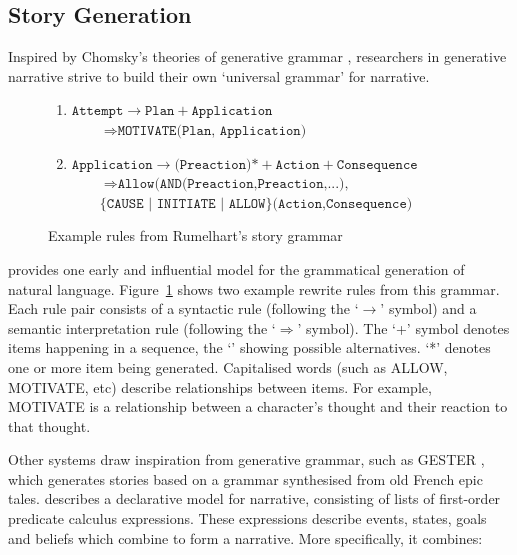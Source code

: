 \documentclass[11pt]{report}
\begin{document}
\subsection{Story Generation}
Inspired by Chomsky's theories of generative grammar \citep{chomsky1968sound}, researchers in generative narrative strive to build their own `universal grammar' for narrative.

\begin{figure}[!t]
  \begin{center}
  \begin{enumerate}
    \item $\texttt{Attempt}\rightarrow \texttt{Plan} + \texttt{Application}$\\
           $\qquad\Rightarrow\texttt{MOTIVATE(Plan, Application)}$
    \item $\texttt{Application}\rightarrow\texttt{(Preaction)*} + \texttt{Action} + \texttt{Consequence}$\\
           $\qquad\Rightarrow\texttt{Allow(AND(Preaction,Preaction,...),}$\\
           $\qquad\{\texttt{CAUSE | INITIATE | ALLOW}\}\texttt{(Action,Consequence)}$
  \end{enumerate}
  \end{center}

  \caption{Example rules from Rumelhart's story grammar}\label{fig:rumelhart}
\end{figure}

\citet{rumelhart1975notes} provides one early and influential model for the
grammatical generation of natural language. Figure~\ref{fig:rumelhart} shows two
example rewrite rules from this grammar. Each rule pair consists of a
syntactic rule (following the `$\rightarrow$' symbol) and a semantic
interpretation rule (following the `$\Rightarrow$' symbol). The `+' symbol denotes items happening in a sequence, the `\textbar' showing possible alternatives. `*' denotes one or more item being generated. Capitalised words (such as ALLOW, MOTIVATE, etc) describe relationships between items. For example, MOTIVATE is a relationship between a character's thought and their reaction to that thought.

Other systems draw inspiration from generative grammar, such as GESTER \citep{pemberton1989modular}, which generates stories based on a grammar synthesised from old French epic tales. \citet{lang1999declarative} describes a declarative model for narrative, consisting of lists of first-order predicate calculus expressions. These expressions describe events, states, goals and beliefs which combine to form a narrative. More specifically, it combines:
\end{document}
